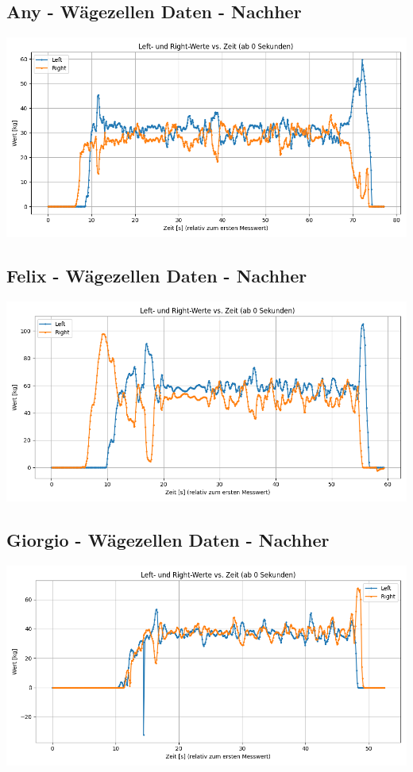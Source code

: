





\subsection{Any - Wägezellen Daten - Nachher}
\includegraphics[width=.99\textwidth]{img/pyplots/Messdaten - Any.png}

\subsection{Felix - Wägezellen Daten - Nachher}
\includegraphics[width=.99\textwidth]{img/pyplots/Messdaten - Felix.png}

\subsection{Giorgio - Wägezellen Daten - Nachher}
\includegraphics[width=.99\textwidth]{img/pyplots/Messdaten - Giorgio.png}

